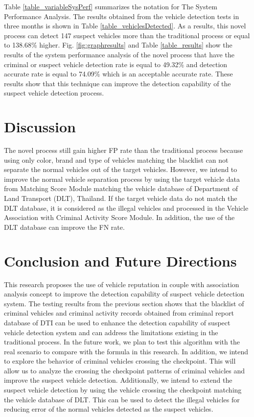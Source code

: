 Table \ref{table_variableSysPerf} summarizes the notation for The System Performance Analysis.
The results obtained from the vehicle detection tests in three months is shown in Table \ref{table_vehiclesDetected}.
As a results, this novel process can detect 147 suspect vehicles more than the traditional process or equal to 138.68\% higher.
Fig. \ref{fig:graphresults} and Table \ref{table_results} show the results of the system performance analysis of the novel process that have the criminal or suspect vehicle detection rate is equal to 49.32\% and detection accurate rate is equal to 74.09\% which is an acceptable accurate rate. These results show that this technique can improve the detection capability of the suspect vehicle detection process.

\section{Discussion}
\label{sec:9}
The novel process still gain higher FP rate than the traditional process because using only color, brand and type of vehicles matching the blacklist can not separate the normal vehicles out of the target vehicles. However, we intend to improve the normal vehicle separation process by using the target vehicle data from Matching Score Module matching the vehicle database of Department of Land Transport (DLT), Thailand. If the target vehicle data do not match the DLT database, it is considered as the illegal vehicles and processed in the Vehicle Association with Criminal Activity Score Module. In addition, the use of the DLT database can improve the FN rate.

\section{Conclusion and Future Directions}
\label{sec:10}
This research proposes the use of vehicle reputation in couple with association analysis concept to improve the detection capability of suspect vehicle detection system.
The testing results from the previous section shows that the blacklist of criminal vehicles and criminal activity records obtained from criminal report database of DTI can be used to enhance the detection capability of suspect vehicle detection system and can address the limitations existing in the traditional process. 
In the future work, we plan to test this algorithm with the real scenario to compare with the formula in this research. 
In addition, we intend to explore the behavior of criminal vehicles crossing the checkpoint. This will allow us to analyze the crossing the checkpoint patterns of criminal vehicles and improve the suspect vehicle detection. Additionally, we intend to extend the suspect vehicle detection by using the vehicle crossing the checkpoint matching the vehicle database of DLT. This can be used to detect the illegal vehicles for reducing error of the normal vehicles detected as the suspect vehicles.

